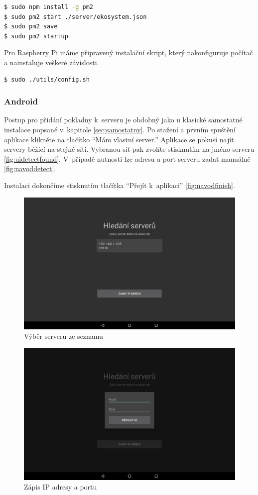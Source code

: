 \documentclass[a4paper,11pt,oneside]{article}
\begin{document}
\begin{lstlisting}[language=bash, caption={Bash}]
$ sudo npm install -g pm2
$ sudo pm2 start ./server/ekosystem.json
$ sudo pm2 save
$ sudo pm2 startup
\end{lstlisting}

Pro Raspberry Pi máme připravený instalační skript, který nakonfiguruje počítač a nainstaluje veškeré závislosti. 

\begin{lstlisting}[language=bash, caption={Bash}]
$ sudo ./utils/config.sh
\end{lstlisting}

\subsubsection{Android}

Postup pro přidání pokladny k~serveru je obdobný jako u klasické samostatné instalace popsané v~kapitole \ref{sec:samostatny}. Po stažení a prvním spuštění aplikace klikněte na tlačítko \enquote{Mám vlastní server.} Aplikace se pokusí najít servery běžící na stejné síti. Vybranou síť pak zvolíte stisknutím na jméno serveru \eqref{fig:uidetectfound}. V~případě nutnosti lze adresu a port serveru zadat manuálně \eqref{fig:navoddetect}. 

Instalaci dokončíme stisknutím tlačítka \enquote{Přejít k~aplikaci} \eqref{fig:navodfinish}.

\begin{figure}[H]
	\centering
	\includegraphics[width=0.6\linewidth]{../ui_detect_found}
	\caption{Výběr serveru ze seznamu}
	\label{fig:uidetectfound}
\end{figure}

\begin{figure}[H]
	\centering
	\includegraphics[width=0.6\linewidth]{../navod_detect}
	\caption{Zápis IP adresy a portu}
	\label{fig:navoddetect}
\end{figure}
\end{document}
